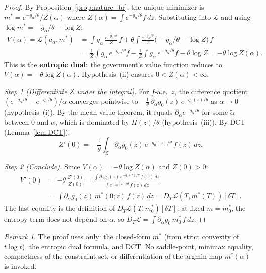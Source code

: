 \documentclass[12pt,a4paper]{article}
\theoremstyle{definition}
\theoremstyle{plain}
\theoremstyle{remark}
\newtheorem{remark}{Remark}[section]
\newcommand{\calZ}{\mathcal{Z}}
\newcommand{\calL}{\mathcal{L}}
\begin{document}
\begin{proof}
By Proposition~\ref{prop:nature_br}, the unique minimizer is $m^* = e^{-g_\alpha/\theta}/Z(\alpha)$ where $Z(\alpha) = \int e^{-g_\alpha/\theta}f\,dz$. Substituting into $\calL$ and using $\log m^* = -g_\alpha/\theta - \log Z$:
\begin{align*}
  V(\alpha) = \calL(a_\alpha, m^*)
  &= \int g_\alpha\,\frac{e^{-g_\alpha/\theta}}{Z}\,f
  + \theta \int \frac{e^{-g_\alpha/\theta}}{Z}
    \bigl(-g_\alpha/\theta - \log Z\bigr)\,f \\
  &= \frac{1}{Z}\int g_\alpha\,e^{-g_\alpha/\theta}f
  - \frac{1}{Z}\int g_\alpha\,e^{-g_\alpha/\theta}f
  - \theta\log Z
  = -\theta\log Z(\alpha).
\end{align*}
This is the \textbf{entropic dual}: the government's value function reduces to $V(\alpha) = -\theta\log Z(\alpha)$.
Hypothesis~(ii) ensures $0 < Z(\alpha) < \infty$.

\emph{Step 1 (Differentiate $Z$ under the integral).}
For $f$-a.e.\ $z$, the difference quotient
$(e^{-g_\alpha/\theta}
- e^{-g_0/\theta})/\alpha$
converges pointwise to
$-\frac{1}{\theta}\,\partial_\alpha g_0(z)\,
e^{-g_0(z)/\theta}$
as $\alpha \to 0$ (hypothesis~(i)).  By the mean value
theorem, it equals
$\partial_\alpha e^{-g_{\tilde\alpha}/\theta}$ for
some $\tilde\alpha$ between $0$ and $\alpha$, which is
dominated by $H(z)/\theta$ (hypothesis~(iii)).  By DCT
(Lemma~\ref{lem:DCT}):
\[
  Z'(0) = -\frac{1}{\theta}
  \int_\calZ \partial_\alpha g_0(z)\,
  e^{-g_0(z)/\theta}\,f(z)\,dz.
\]

\emph{Step 2 (Conclude).}
Since $V(\alpha) = -\theta\log Z(\alpha)$ and
$Z(0) > 0$:
\begin{align*}
  V'(0)
  &= -\theta\,\frac{Z'(0)}{Z(0)}
  = \frac{\int \partial_\alpha g_0(z)\,
    e^{-g_0(z)/\theta}\,f(z)\,dz}
    {\int e^{-g_0(z)/\theta}\,f(z)\,dz} \\
  &= \int \partial_\alpha g_0(z)\,m^*(0;z)\,
    f(z)\,dz
  = D_T\calL(T, m^*(T))[\delta T].
\end{align*}
The last equality is the definition of
$D_T\calL(T,m^*_0)[\delta T]$: at fixed $m = m^*_0$,
the entropy term does not depend on $\alpha$, so
$D_T\calL = \int \partial_\alpha g_0\,m^*_0\,f\,dz$.
\end{proof}

\begin{remark}
\label{rem:no_minimax}
The proof uses only: the closed-form $m^*$ (from strict
convexity of $t\log t$), the entropic dual formula, and
DCT\@.  No saddle-point, minimax equality, compactness
of the constraint set, or differentiation of the argmin
map $m^*(\alpha)$ is invoked.
\end{remark}
\end{document}
